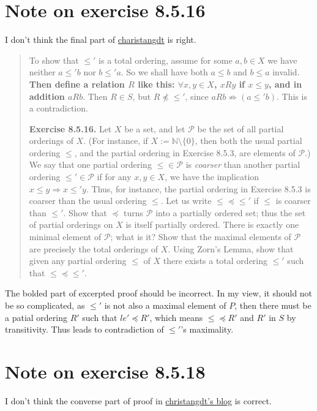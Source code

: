 \documentclass{article}
\begin{document}
\section{Note on exercise 8.5.16}
I don't think the final part of
\href{https://christangdt.home.blog/2019/09/19/%e9%99%b6%e5%93%b2%e8%bd%a9%e5%ae%9e%e5%88%86%e6%9e%908-5%e5%8f%8a%e4%b9%a0%e9%a2%98-analysis-i-8-5-part-2/}{charistangdt}
is right.
\begin{quotation}
    To show that $\leq '$ is a total ordering, assume for some $a, b \in X$ we have
    neither $a \leq ' b$ nor $b \leq ' a$. So we shall have both $a \leq b$ and
    $b \leq a$ invalid. \textbf{Then define a relation $R$ like this:
        $\forall x, y \in X$, $xRy$ if $x \leq y$, and in addition $aRb$}. Then
    $R \in S$, but $R \not\preceq \leq '$, since $aRb \not\Rightarrow (a \leq ' b)$.
    This is a contradiction.

    \textbf{Exercise 8.5.16.} Let $X$ be a set, and let $\mathcal{P}$ be the set of all
    partial orderings of $X$. (For instance, if $X := \mathbb{N} \setminus \{0\}$, then
    both the usual partial ordering $\leq$, and the partial ordering in Exercise 8.5.3,
    are elements of $\mathcal{P}$.)
    We say that one partial ordering $\leq \in \mathcal{P}$ is \textit{coarser} than
    another partial ordering $\leq ' \in \mathcal{P}$ if for any $x, y \in X$, we have
    the implication $x \leq y \Rightarrow x \leq ' y$. Thus, for instance, the partial
    ordering in Exercise 8.5.3 is coarser than the usual ordering $\leq$.
    Let us write $\leq \preceq \leq '$ if $\leq$ is coarser than $\leq '$.
    Show that $\preceq$ turns $\mathcal{P}$ into a partially ordered set; thus the set
    of partial orderings on $X$ is itself partially ordered.
    There is exactly one minimal element of $\mathcal{P}$; what is it? Show that the
    maximal elements of $\mathcal{P}$ are precisely the total orderings of $X$. Using
    Zorn's Lemma, show that given any partial ordering $\leq$ of $X$ there exists a
    total ordering $\leq '$ such that $\leq \preceq \leq '$.
\end{quotation}

The bolded part of excerpted proof should be incorrect.
In my view, it should not be so complicated, as $\le'$ is not also a maximal element
of $P$, then there must be a patial ordering $R'$ such that $le'\preceq R'$, which means
$\le\preceq R'$ and $R'$ in $S$ by transitivity. Thus leads to contradiction of $\le'$'s
maximality.


\section{Note on exercise 8.5.18}
I don't think the converse part of proof in 
\href{https://christangdt.home.blog/2019/09/19/%e9%99%b6%e5%93%b2%e8%bd%a9%e5%ae%9e%e5%88%86%e6%9e%908-5%e5%8f%8a%e4%b9%a0%e9%a2%98-analysis-i-8-5-part-2/}{christangdt's blog}
is correct.
\end{document}
